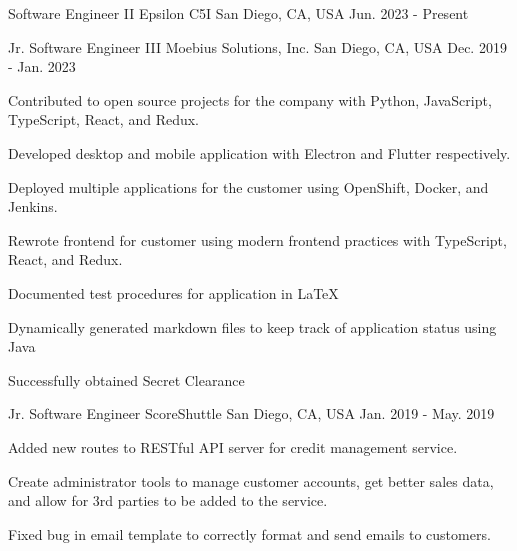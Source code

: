 

\begin{cventries}

	\cventry
	{Software Engineer II} %
	{Epsilon C5I} %
	{San Diego, CA, USA} %
	{Jun. 2023 - Present} %
	{}

	\cventry
	{Jr. Software Engineer III} %
	{Moebius Solutions, Inc.} %
	{San Diego, CA, USA} %
	{Dec. 2019 - Jan. 2023} %
	{
		\begin{cvitems} %
			\item {Contributed to open source projects for the company with Python, JavaScript, TypeScript, React, and Redux.}
			\item {Developed desktop and mobile application with Electron and Flutter respectively.}
			\item {Deployed multiple applications for the customer using OpenShift, Docker, and Jenkins.}
			\item {Rewrote frontend for customer using modern frontend practices with TypeScript, React, and Redux.}
			\item {Documented test procedures for application in LaTeX}
			\item {Dynamically generated markdown files to keep track of application status using Java}
			\item {Successfully obtained Secret Clearance}
		\end{cvitems}
	}

	\cventry
	{Jr. Software Engineer} %
	{ScoreShuttle} %
	{San Diego, CA, USA} %
	{Jan. 2019 - May. 2019} %
	{
		\begin{cvitems} %
			\item {Added new routes to RESTful API server for credit management service.}
			\item {Create administrator tools to manage customer accounts, get better sales data, and allow for 3rd parties to be added to the service.}
			\item {Fixed bug in email template to correctly format and send emails to customers.}
		\end{cvitems}
	}

\end{cventries}
